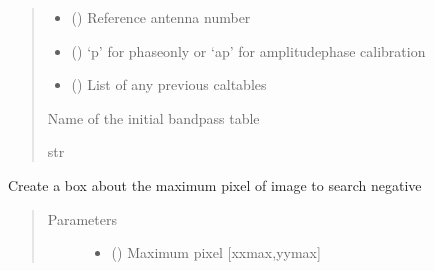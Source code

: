 \documentclass[letterpaper,10pt,english]{sphinxmanual}
\begin{document}
\begin{fulllineitems}
\begin{fulllineitems}
\begin{quote}
\begin{description}
\begin{itemize}
\item {} 
\sphinxAtStartPar
{} () \textendash{} Reference antenna number

\item {} 
\sphinxAtStartPar
{} () \textendash{} ‘p’ for phase\sphinxhyphen{}only or ‘ap’ for amplitude\sphinxhyphen{}phase calibration

\item {} 
\sphinxAtStartPar
{} () \textendash{} List of any previous caltables

\end{itemize}

\item[{Returns}] \leavevmode
\sphinxAtStartPar
Name of the initial bandpass table

\item[{Return type}] \leavevmode
\sphinxAtStartPar
str

\end{description}\end{quote}

\end{fulllineitems}


\begin{fulllineitems}
\label{\detokenize{paircars:paircars.intensity_selfcal_LTS.IntensitySelfcal.negative_box}}
\sphinxAtStartPar
Create a box about the maximum pixel of image to search negative
\begin{quote}\begin{description}
\item[{Parameters}] \leavevmode\begin{itemize}
\item {} 
\sphinxAtStartPar
{} () \textendash{} Maximum pixel {[}xxmax,yymax{]}


\end{itemize}
\end{description}
\end{quote}
\end{fulllineitems}
\end{fulllineitems}
\end{document}
